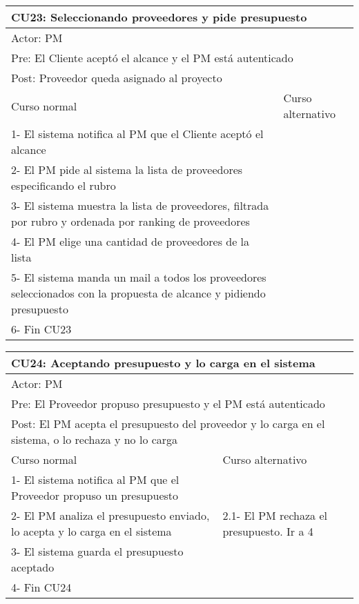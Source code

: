 \begin{table}[H]
  \begin{adjustbox}{max width = \textwidth}
  \begin{tabular}{|l|l|}
    \hline
    \multicolumn{2}{|l|}{CU23: Seleccionando proveedores y pide presupuesto} \\\hline
    \multicolumn{2}{|l|}{Actor: PM} \\\hline
    \multicolumn{2}{|l|}{Pre: El Cliente aceptó el alcance y el PM está autenticado} \\\hline
    \multicolumn{2}{|l|}{Post: Proveedor queda asignado al proyecto} \\\hline
     Curso normal & Curso alternativo\\ \hline
     1- El sistema notifica al PM que el Cliente aceptó el alcance & \\ \hline
     2- El PM pide al sistema la lista de proveedores especificando el rubro & \\ \hline
     3- El sistema muestra la lista de proveedores, filtrada por rubro y ordenada por ranking de proveedores & \\ \hline
     4- El PM elige una cantidad de proveedores de la lista & \\ \hline
     5- El sistema manda un mail a todos los proveedores seleccionados con la propuesta de alcance y pidiendo presupuesto & \\ \hline
     6- Fin CU23 & \\ \hline
 \end{tabular}
  \end{adjustbox}
\end{table}


\begin{table}[H]
  \begin{adjustbox}{max width = \textwidth}
  \begin{tabular}{|l|l|}
    \hline
    \multicolumn{2}{|l|}{CU24: Aceptando presupuesto y lo carga en el sistema} \\\hline
    \multicolumn{2}{|l|}{Actor: PM} \\\hline
    \multicolumn{2}{|l|}{Pre: El Proveedor propuso presupuesto y el PM está autenticado} \\\hline
    \multicolumn{2}{|l|}{Post: El PM acepta el presupuesto del proveedor y lo carga en el sistema, o lo rechaza y no lo carga} \\\hline
     Curso normal & Curso alternativo\\ \hline
     1- El sistema notifica al PM que el Proveedor propuso un presupuesto & \\ \hline
     2- El PM analiza el presupuesto enviado, lo acepta y lo carga en el sistema & 2.1- El PM rechaza el presupuesto. Ir a 4 \\ \hline
     3- El sistema guarda el presupuesto aceptado & \\ \hline
     4- Fin CU24 & \\ \hline
 \end{tabular}
  \end{adjustbox}
\end{table}

